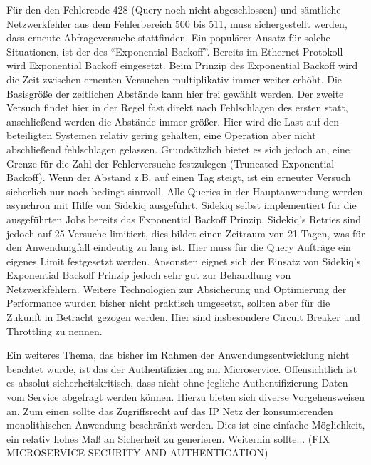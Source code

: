 Für den den Fehlercode 428 (Query noch nicht abgeschlossen) und sämtliche Netzwerkfehler aus dem Fehlerbereich 500 bis 511, muss sichergestellt werden, dass erneute Abfrageversuche stattfinden.
Ein populärer Ansatz für solche Situationen, ist der des ``Exponential Backoff''\cite{expbackoff}. Bereits im Ethernet Protokoll wird Exponential Backoff eingesetzt\cite{etherbackoff}. Beim Prinzip des Exponential Backoff wird die Zeit zwischen erneuten Versuchen multiplikativ immer weiter erhöht. Die Basisgröße der zeitlichen Abstände kann hier frei gewählt werden. Der zweite Versuch findet hier in der Regel fast direkt nach Fehlschlagen des ersten statt, anschließend werden die Abstände immer größer. Hier wird die Last auf den beteiligten Systemen relativ gering gehalten, eine Operation aber nicht abschließend fehlschlagen gelassen. Grundsätzlich bietet es sich jedoch an, eine Grenze für die Zahl der Fehlerversuche festzulegen (Truncated Exponential Backoff). Wenn der Abstand z.B. auf einen Tag steigt, ist ein erneuter Versuch sicherlich nur noch bedingt sinnvoll.
Alle Queries in der Hauptanwendung werden asynchron mit Hilfe von Sidekiq\cite{sidekiq} ausgeführt. Sidekiq selbst implementiert für die ausgeführten Jobs bereits das Exponential Backoff Prinzip. Sidekiq's Retries sind jedoch auf 25 Versuche limitiert, dies bildet einen Zeitraum von 21 Tagen\cite{sidekiq:errors}, was für den Anwendungfall eindeutig zu lang ist. Hier muss für die Query Aufträge ein eigenes Limit festgesetzt werden. Ansonsten eignet sich der Einsatz von Sidekiq's Exponential Backoff Prinzip jedoch sehr gut zur Behandlung von Netzwerkfehlern. 
Weitere Technologien zur Absicherung und Optimierung der Performance wurden bisher nicht praktisch umgesetzt, sollten aber für die Zukunft in Betracht gezogen werden. Hier sind insbesondere Circuit Breaker\cite{MSDN:Circuit}\cite{Fowler:Circuit} und Throttling\cite{MSDN:Throttling} zu nennen.

Ein weiteres Thema, das bisher im Rahmen der Anwendungsentwicklung nicht beachtet wurde, ist das der Authentifizierung am Microservice. Offensichtlich ist es absolut sicherheitskritisch, dass nicht ohne jegliche Authentifizierung Daten vom Service abgefragt werden können. Hierzu bieten sich diverse Vorgehensweisen an. Zum einen sollte das Zugriffsrecht auf das IP Netz der konsumierenden monolithischen Anwendung beschränkt werden. Dies ist eine einfache Möglichkeit, ein relativ hohes Maß an Sicherheit zu generieren. Weiterhin sollte... (FIX MICROSERVICE SECURITY AND AUTHENTICATION)

